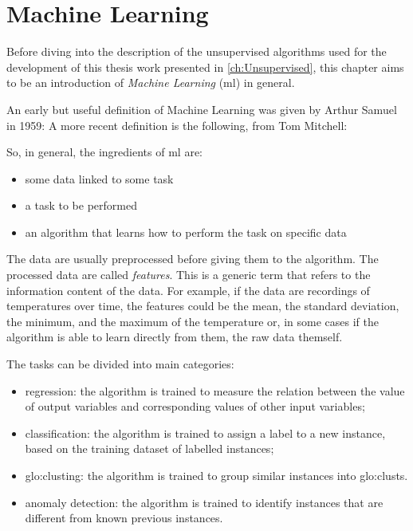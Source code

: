 \chapter{Machine Learning}
\label{ch:MachineLearning}

Before diving into the description of the unsupervised algorithms used for the development of this thesis work presented in \autoref{ch:Unsupervised}, this chapter aims to be an introduction of \emph{Machine Learning} (\gls{ml}) in general.

An early but useful definition of Machine Learning was given by Arthur Samuel in 1959:  A more recent definition is the following, from Tom Mitchell:  

So, in general, the ingredients of \gls{ml} are:
\begin{itemize}
    \item some data linked to some task
    \item a task to be performed
    \item an algorithm that learns how to perform the task on specific data
\end{itemize}

The data are usually preprocessed before giving them to the algorithm. The processed data are called \emph{features}. This is a generic term that refers to the information content of the data.
For example, if the data are recordings of temperatures over time, the features could be the mean, the standard deviation, the minimum, and the maximum of the temperature or, in some cases if the algorithm is able to learn directly from them, the raw data themself.

The tasks can be divided into main categories:
\begin{itemize}
    \item regression: the algorithm is trained to measure the relation between the value of output variables and corresponding values of other input variables;
    \item classification: the algorithm is trained to assign a label to a new instance, based on the training dataset of labelled instances;
    \item \gls{glo:clust}ing: the algorithm is trained to group similar instances into \gls{glo:clust}s.
    \item anomaly detection: the algorithm is trained to identify instances that are different from known previous instances.
\end{itemize}

